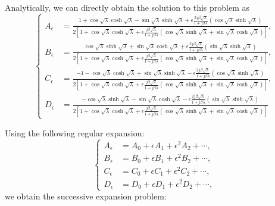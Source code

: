 \documentclass{article}
\begin{document}
Analytically, we can directly obtain the solution to this problem as 
\begin{equation}
    \left\{\begin{aligned}
        A_\epsilon &= \frac{ 1 + \cos\sqrt{\lambda } \cosh\sqrt{\lambda } - \sin\sqrt{\lambda } \sinh\sqrt{\lambda} + \epsilon \frac{2 j \beta \sqrt{\lambda}}{ 1+ j \beta \lambda } \left( \cos\sqrt{\lambda } \sinh\sqrt{\lambda } \right)}{2 \left[ 1 + \cos\sqrt{\lambda } \cosh\sqrt{\lambda } + \epsilon\frac{j \beta \sqrt{\lambda}}{ 1+ j \beta \lambda } \left( \cos\sqrt{\lambda } \sinh\sqrt{\lambda } + \sin\sqrt{\lambda } \cosh\sqrt{\lambda } \right) \right]}, \\
        B_\epsilon &= \frac{ \cos\sqrt{\lambda } \sinh\sqrt{\lambda } + \sin\sqrt{\lambda } \cosh\sqrt{\lambda} + \epsilon \frac{2 j \beta \sqrt{\lambda}}{ 1+ j \beta \lambda } \left( \sin\sqrt{\lambda } \sinh\sqrt{\lambda } \right)}{2 \left[ 1 + \cos\sqrt{\lambda } \cosh\sqrt{\lambda } + \epsilon\frac{j \beta \sqrt{\lambda}}{ 1+ j \beta \lambda } \left( \cos\sqrt{\lambda } \sinh\sqrt{\lambda } + \sin\sqrt{\lambda } \cosh\sqrt{\lambda } \right) \right]}, \\
        C_\epsilon &= \frac{ -1 - \cos\sqrt{\lambda } \cosh\sqrt{\lambda } + \sin\sqrt{\lambda } \sinh\sqrt{\lambda} - \epsilon \frac{2 j \beta \sqrt{\lambda}}{ 1+ j \beta \lambda } \left( \cos\sqrt{\lambda } \sinh\sqrt{\lambda } \right)}{2 \left[ 1 + \cos\sqrt{\lambda } \cosh\sqrt{\lambda } + \epsilon\frac{j \beta \sqrt{\lambda}}{ 1+ j \beta \lambda } \left( \cos\sqrt{\lambda } \sinh\sqrt{\lambda } + \sin\sqrt{\lambda } \cosh\sqrt{\lambda } \right) \right]}, \\
        D_\epsilon &= \frac{ -\cos\sqrt{\lambda } \sinh\sqrt{\lambda } - \sin\sqrt{\lambda } \cosh\sqrt{\lambda} - \epsilon \frac{2 j \beta \sqrt{\lambda}}{ 1+ j \beta \lambda } \left( \sin\sqrt{\lambda } \sinh\sqrt{\lambda } \right)}{2 \left[ 1 + \cos\sqrt{\lambda } \cosh\sqrt{\lambda } + \epsilon\frac{j \beta \sqrt{\lambda}}{ 1+ j \beta \lambda } \left( \cos\sqrt{\lambda } \sinh\sqrt{\lambda } + \sin\sqrt{\lambda } \cosh\sqrt{\lambda } \right) \right]}
    \end{aligned}\right.
\end{equation}


Using the following regular expansion:
\begin{equation}
    \left\{\begin{aligned}
        A_\epsilon &= A_0 + \epsilon A_1 + \epsilon^2 A_2 + \cdots, \\
        B_\epsilon &= B_0 + \epsilon B_1 + \epsilon^2 B_2 + \cdots, \\
        C_\epsilon &= C_0 + \epsilon C_1 + \epsilon^2 C_2 + \cdots, \\
        D_\epsilon &= D_0 + \epsilon D_1 + \epsilon^2 D_2 + \cdots, 
    \end{aligned}\right.
\end{equation}
we obtain the successive expansion problem:
\end{document}
